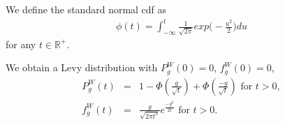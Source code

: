 \documentclass[aop]{imsart}
\theoremstyle{plain}
\theoremstyle{remark}
\newcommand{\reels}{\mathbb{R}}
\begin{document}
We define the standard normal cdf as 
\begin{eqnarray}
\label{def_standardgaussian}
\phi (t)=\int_{-\infty}^{t} \frac{1}{\sqrt{2 \pi}} exp{\big(-\frac{u^2}{2}\big)}  du 
\end{eqnarray}
for any $t \in \reels^+$.
\begin{lemma}
\label{lemma_nrc1} We obtain a Levy distribution with $P_g^W (0)  =  0$, $f_g^W (0)  =  0$, 
\begin{eqnarray}
 \label{eqP_lemma_nrc1}
P_g^W (t) & = & 1 - \Phi \left(\frac{g}{\sqrt{t}}\right) + \Phi \left(\frac{-g}{\sqrt{t}}\right) \text{ for } t>0,\\
\label{eqf_lemma_nrc1} f_g^W (t) & = & \frac{g}{\sqrt{2 \pi t^3}} e^{\frac{-g^2}{2t}} \text{ for } t>0.
\end{eqnarray}
\end{lemma}
\end{document}
